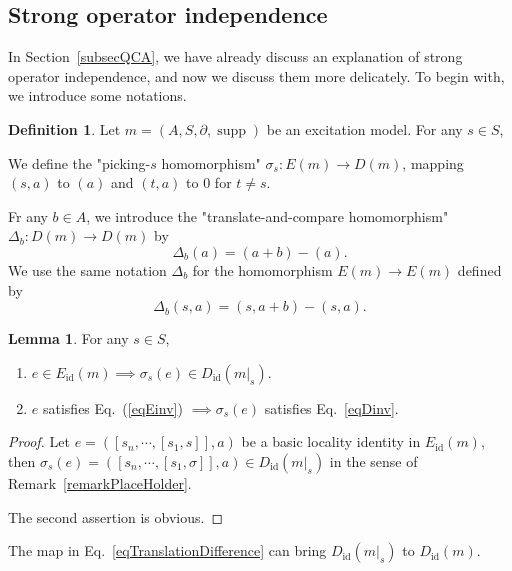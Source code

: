 \documentclass[reprint, amsmath, amssymb, showpacs, floatfix, longbibliography, aps, twocolumn, superscriptaddress, nofootinbib]{revtex4-2}
\newcommand{\supp}{\operatorname{supp}}
\theoremstyle{definition}
\newtheorem{lemma}{Lemma}[section]
\newtheorem{definition}{Definition}[section]
\begin{document}
\subsection{Strong operator independence}

In Section~\ref{subsecQCA}, we have already discuss an explanation of strong operator independence, and now we discuss them more delicately. To begin with, we introduce some notations.

\begin{definition}
	Let $m=(A,S,\partial,\supp)$ be an excitation model. For any $s\in S$,
	
	 We define the "picking-$s$ homomorphism" $\sigma_s: E(m)\rightarrow D(m)$, mapping $(s,a)$ to $(a)$ and $(t,a)$ to $0$ for $t\ne s$. 

	Fr any $b\in A$, we introduce the "translate-and-compare homomorphism" $\Delta_b:D(m)\rightarrow D(m)$ by
	\begin{equation}
		\Delta_b(a)=(a+b)-(a).
	\end{equation}
	We use the same notation $\Delta_b$ for the homomorphism $E(m)\rightarrow E(m)$ defined by
	\begin{equation}\label{eqTranslationDifference}
		\Delta_b(s,a)=(s,a+b)-(s,a).
	\end{equation}
\end{definition}

\begin{lemma}\label{lemmaBoundary}
	For any $s\in S$,
	\begin{enumerate}
		\item $e\in E_{\operatorname{id}}(m)\implies\sigma_{s}(e)\in D_{\operatorname{id}}(m|_s)$.
		\item $e$ satisfies Eq.~(\ref{eqEinv}) $\implies \sigma_s(e)$ satisfies Eq.~\eqref{eqDinv}.
	\end{enumerate}
\end{lemma}
\begin{proof}
	Let $e=([s_n,\cdots,[s_1,s]],a)$ be a basic locality identity in $ E_{\operatorname{id}}(m)$, then $\sigma_s(e)=([s_n,\cdots,[s_1,\sigma]],a)\in D_{\operatorname{id}}(m|_s)$ in the sense of Remark~\ref{remarkPlaceHolder}.
	
	The second assertion is obvious.
\end{proof}

The map in Eq.~\eqref{eqTranslationDifference} can bring $D_{\operatorname{id}}(m|_s)$ to $D_{\operatorname{id}}(m)$. 
\end{document}
